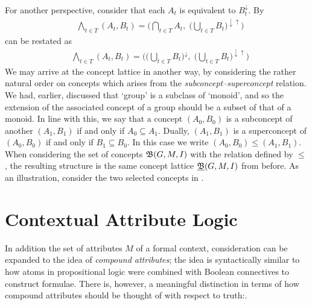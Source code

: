 For another perspective, consider that each $A_{t}$ is equivalent to $B_{t}^{\downarrow}$. By 
\begin{align*}
   & \underset{t \in T}\bigwedge (A_{t}, B_{t}) = \Big( \underset{t \in T}\bigcap A_{t}, \; \big(\underset{t \in T}\bigcup B_{t}\big)^{\downarrow \uparrow}\Big)
\end{align*}
can be restated as
\begin{align*}
   & \underset{t \in T}\bigwedge (A_{t}, B_{t}) = \Big(\big(\underset{t \in T}\bigcup B_{t}\big)^{\downarrow}, \; \big(\underset{t \in T}\bigcup B_{t}\big)^{\downarrow \uparrow}\Big)
\end{align*}
We may arrive at the concept lattice in another way, by considering the rather natural order on concepts which arises from the \textit{subconcept--superconcept}
relation. We had, earlier, discussed that `group' is a subclass of `monoid', and so the extension of the associated concept of a group
should be a subset of that of a monoid. In line with this, we say that a concept $(A_{0},B_{0})$ is a subconcept of another $(A_{1},B_{1})$
if and only if $A_{0}\subseteq A_{1}$. Dually, $(A_{1},B_{1})$ is a superconcept of $(A_{0},B_{0})$ if and only if $B_{1}\subseteq B_{0}$. In
this case we write $(A_{0},B_{0}) \leq (A_{1},B_{1})$. When considering the set of concepts ${\mathfrak B} (G,M,\mathrel{I})$ with the relation defined by $\leq$, the
resulting structure is the same concept lattice $\underline{{\mathfrak B}} (G,M,\mathrel{I})$ from before. As an illustration, consider the two selected concepts in .

\section{Contextual Attribute Logic}
\label{section:contextual-attribute-logic}

In addition the set of attributes $M$ of a formal context, consideration can be expanded to the idea of \textit{compound attributes}; the idea
is syntactically similar to how atoms in propositional logic were combined with Boolean connectives to construct formulae. There is, however,
a meaningful distinction in terms of how compound attributes should be thought of with respect to truth:.

